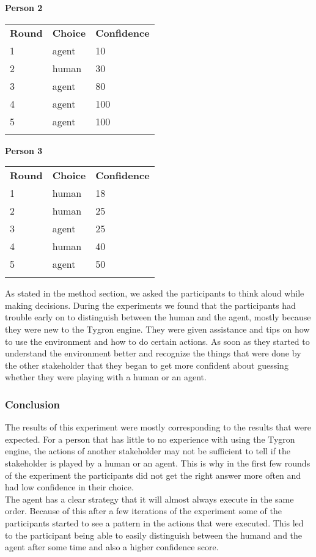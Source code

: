 \textbf{Person 2}
\begin{tabular}{lll}
\textbf{Round} & \textbf{Choice}  & \textbf{Confidence}\\ 
1 & agent  & 10        \\
2 & human  & 30         \\
3 & agent  & 80         \\
4 & agent  & 100         \\
5 & agent  & 100       \\\\
\end{tabular}

\textbf{Person 3}
\begin{tabular}{lll}
\textbf{Round} & \textbf{Choice}  & \textbf{Confidence}\\ 
1 & human  & 18         \\
2 & human  & 25         \\
3 & agent  & 25         \\
4 & human  & 40         \\
5 & agent  & 50        \\\\
\end{tabular}

As stated in the method section, we asked the participants to think aloud while making decisions. During the experiments we found that the participants had trouble early on to distinguish between the human and the agent, mostly because they were new to the Tygron engine. They were given assistance and tips on how to use the environment and how to do certain actions. As soon as they started to understand the environment better and recognize the things that were done by the other stakeholder that they began to get more confident about guessing whether they were playing with a human or an agent.

\subsubsection{Conclusion}
The results of this experiment were mostly corresponding to the results that were expected. For a person that has little to no experience with using the Tygron engine, the actions of another stakeholder may not be sufficient to tell if the stakeholder is played by a human or an agent. This is why in the first few rounds of the experiment the participants did not get the right answer more often and had low confidence in their choice. \\ The agent has a clear strategy that it will almost always execute in the same order. Because of this after a few iterations of the experiment some of the participants started to see a pattern in the actions that were executed. This led to the participant being able to easily distinguish between the humand and the agent after some time and also a higher confidence score.


